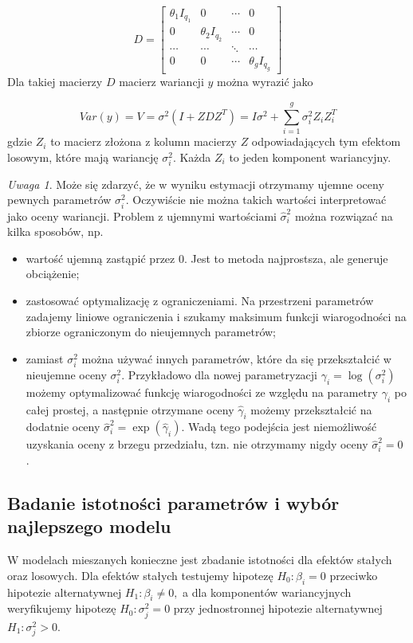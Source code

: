 \documentclass[12pt]{mwbk}
\theoremstyle{plain}
\theoremstyle{definition}
\theoremstyle{remark}
\newtheorem{uwaga}{Uwaga}[chapter]
\begin{document}
$$D=\begin{bmatrix}
\theta_1I_{q_1} & 0 & \cdots & 0 \\
0 & \theta_2I_{q_2} & \cdots & 0 \\
\cdots & \cdots & \ddots & \cdots \\
0 & 0 & \cdots & \theta_gI_{q_g}
\end{bmatrix}$$
Dla takiej macierzy $D$ macierz wariancji $y$ można wyrazić jako

$$Var(y)=V=\sigma^2(I+ZDZ^T)=I\sigma^2+\sum_{i=1}^{g}\sigma_i^2Z_iZ_i^T$$
gdzie $Z_i$ to macierz złożona z kolumn macierzy $Z$ odpowiadających tym efektom losowym, które mają wariancję $\sigma^2_i$. Każda $Z_i$ to jeden komponent wariancyjny.

\begin{uwaga}
	Może się zdarzyć, że w wyniku estymacji otrzymamy ujemne oceny pewnych parametrów $\sigma_i^2$. Oczywiście nie można takich wartości interpretować jako oceny wariancji. Problem z ujemnymi wartościami $\hat{\sigma}^2_i$ można rozwiązać na kilka sposobów, np.
	\begin{itemize}
		\item wartość ujemną zastąpić przez 0. Jest to metoda najprostsza, ale generuje obciążenie;
		\item zastosować optymalizację z ograniczeniami. Na przestrzeni parametrów zadajemy liniowe ograniczenia i szukamy maksimum funkcji wiarogodności na zbiorze ograniczonym do nieujemnych parametrów;
		\item zamiast $\sigma_i^2$ można używać innych parametrów, które da się przekształcić w nieujemne oceny $\sigma^2_i$. Przykładowo dla nowej parametryzacji $\gamma_i=\log(\sigma^2_i)$ możemy optymalizować funkcję wiarogodności ze względu na parametry $\gamma_i$ po całej prostej, a następnie otrzymane oceny $\hat{\gamma}_i$ możemy przekształcić na dodatnie oceny $\hat{\sigma}_i^2=\exp(\hat{\gamma}_i)$. Wadą tego podejścia jest niemożliwość uzyskania oceny z brzegu przedziału, tzn. nie otrzymamy nigdy oceny $\hat{\sigma}^2_i=0$ \cite{biecek}.
	\end{itemize}
\end{uwaga}


\subsection{Badanie istotności parametrów i wybór najlepszego modelu}

W modelach mieszanych konieczne jest zbadanie istotności dla efektów stałych oraz losowych. Dla efektów stałych testujemy hipotezę $H_0: \beta_i=0$ przeciwko hipotezie alternatywnej $H_1: \beta_i \neq 0,$ a dla komponentów wariancyjnych weryfikujemy hipotezę $H_0: \sigma^2_j=0$ przy jednostronnej hipotezie alternatywnej  $H_1: \sigma^2_j>0.$ 
\end{document}
